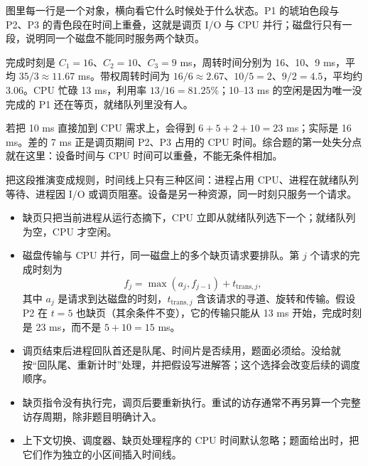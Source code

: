 \begin{center}
\end{center}

图里每一行是一个对象，横向看它什么时候处于什么状态。P1 的琥珀色段与 P2、P3 的青色段在时间上重叠，这就是调页 I/O 与 CPU 并行；磁盘行只有一段，说明同一个磁盘不能同时服务两个缺页。

完成时刻是 $C_1=16$、$C_2=10$、$C_3=9$ ms，周转时间分别为 16、10、9 ms，平均 $35/3\approx11.67$ ms。带权周转时间为 $16/6\approx2.67$、$10/5=2$、$9/2=4.5$，平均约 $3.06$。CPU 忙碌 13 ms，利用率 $13/16=81.25\%$；10--13 ms 的空闲是因为唯一没完成的 P1 还在等页，就绪队列里没有人。

若把 10 ms 直接加到 CPU 需求上，会得到 $6+5+2+10=23$ ms；实际是 16 ms。差的 7 ms 正是调页期间 P2、P3 占用的 CPU 时间。综合题的第一处失分点就在这里：设备时间与 CPU 时间可以重叠，不能无条件相加。

把这段推演变成规则，时间线上只有三种区间：进程占用 CPU、进程在就绪队列等待、进程因 I/O 或调页阻塞。设备是另一种资源，同一时刻只服务一个请求。

\begin{itemize}
  \item 缺页只把当前进程从运行态摘下，CPU 立即从就绪队列选下一个；就绪队列为空，CPU 才空闲。
  \item 磁盘传输与 CPU 并行，同一磁盘上的多个缺页请求要排队。第 $j$ 个请求的完成时刻为
  \[
  f_j=\max(a_j,f_{j-1})+t_{\text{trans},j},
  \]
  其中 $a_j$ 是请求到达磁盘的时刻，$t_{\text{trans},j}$ 含该请求的寻道、旋转和传输。假设 P2 在 $t=5$ 也缺页（其余条件不变），它的传输只能从 13 ms 开始，完成时刻是 23 ms，而不是 $5+10=15$ ms。
  \item 调页结束后进程回队首还是队尾、时间片是否续用，题面必须给。没给就按“回队尾、重新计时”处理，并把假设写进解答；这个选择会改变后续的调度顺序。
  \item 缺页指令没有执行完，调页后要重新执行。重试的访存通常不再另算一个完整访存周期，除非题目明确计入。
  \item 上下文切换、调度器、缺页处理程序的 CPU 时间默认忽略；题面给出时，把它们作为独立的小区间插入时间线。
\end{itemize}

